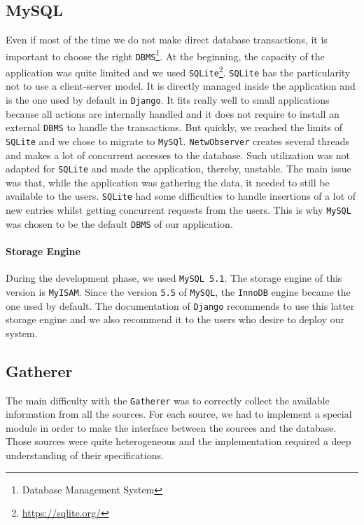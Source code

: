\subsection{MySQL}
Even if most of the time we do not make direct database transactions, it is important to choose the right \texttt{DBMS}\footnote{Database Management System}. At the beginning, the capacity of the application was quite limited and we used \texttt{SQLite}\footnote{\url{https://sqlite.org/}}. \texttt{SQLite} has the particularity not to use a client-server model. It is directly managed inside the application and is the one used by default in \texttt{Django}. It fits really well to small applications because all actions are internally handled and it does not require to install an external \texttt{DBMS} to handle the transactions. But quickly, we reached the limits of \texttt{SQLite} and we chose to migrate to \texttt{MySQl}. \texttt{NetwObserver} creates several threads and makes a lot of concurrent accesses to the database. Such utilization was not adapted for \texttt{SQLite} and made the application, thereby, unstable. The main issue was that, while the application was gathering the data, it needed to still be available to the users. \texttt{SQLite} had some difficulties to handle insertions of a lot of new entries whilst getting concurrent requests from the users. This is why \texttt{MySQL} was chosen to be the default \texttt{DBMS} of our application.


\paragraph*{Storage Engine} During the development phase, we used \texttt{MySQL 5.1}. The storage engine of this version is \texttt{MyISAM}. Since the version \texttt{5.5} of \texttt{MySQL}, the \texttt{InnoDB} engine became the one used by default. The documentation of \texttt{Django} recommends to use this latter storage engine and we also recommend it to the users who desire to deploy our system.

\subsection{Gatherer}
The main difficulty with the \texttt{Gatherer} was to correctly collect the available information from all the sources. For each source, we had to implement a special module in order to make the interface between the sources and the database. Those sources were quite heterogeneous and the implementation required a deep understanding of their specifications. 

